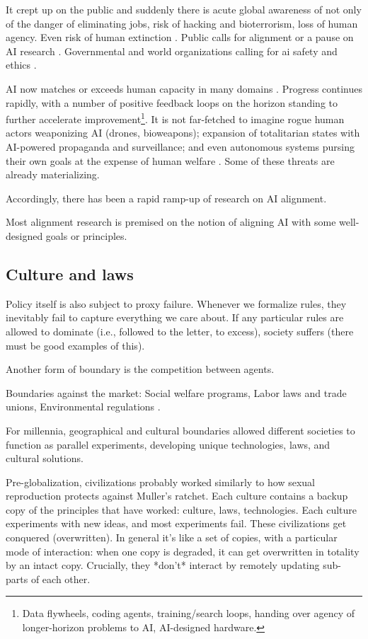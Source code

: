 It crept up on the public and suddenly there is acute global awareness of not only of the danger of eliminating jobs, risk of hacking and bioterrorism, loss of human agency. Even risk of human extinction \citep{cais_statement_2023}. Public calls for alignment \citep{bengio2024managing} or a pause on AI research \citep{bengio2023pause}. Governmental and world organizations calling for ai safety and ethics \citep{unesco2021recommendation, un2024governing, uk2025bletchley}.

AI now matches or exceeds human capacity in many domains \citep{giattino2023test, maslej2024artificial}. Progress continues rapidly, with a number of positive feedback loops on the horizon standing to further accelerate improvement\footnote{Data flywheels, coding agents, training/search loops, handing over agency of longer-horizon problems to AI, AI-designed hardware.}. It is not far-fetched to imagine rogue human actors weaponizing AI (drones, bioweapons); expansion of totalitarian states with AI-powered propaganda and surveillance; and even autonomous systems pursing their own goals at the expense of human welfare \citep{bostrom2014superintelligence}. Some of these threats are already materializing.

Accordingly, there has been a rapid ramp-up of research on AI alignment. 

Most alignment research is premised on the notion of aligning AI with some well-designed goals or principles. 

\subsection{Culture and laws}

Policy itself is also subject to proxy failure. Whenever we formalize rules, they inevitably fail to capture everything we care about. If any particular rules are allowed to dominate (i.e., followed to the letter, to excess), society suffers (there must be good examples of this). 

Another form of boundary is the competition between agents.  

Boundaries against the market: Social welfare programs, Labor laws and trade unions, Environmental regulations  \citep{polanyi1944great}.

For millennia, geographical and cultural boundaries allowed different societies to function as parallel experiments, developing unique technologies, laws, and cultural solutions. 

Pre-globalization, civilizations probably worked similarly to how sexual reproduction protects against Muller's ratchet. Each culture contains a backup copy of the principles that have worked: culture, laws, technologies. Each culture experiments with new ideas, and most experiments fail. These civilizations get conquered (overwritten). In general it's like a set of copies, with a particular mode of interaction: when one copy is degraded, it can get overwritten in totality by an intact copy. Crucially, they *don't* interact by remotely updating sub-parts of each other.

